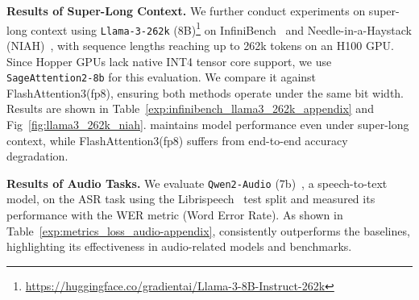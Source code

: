 \noindent\textbf{Results of Super-Long Context.} We further conduct experiments on super-long context using \texttt{Llama-3-262k} (8B)\footnote{\url{https://huggingface.co/gradientai/Llama-3-8B-Instruct-262k}} on InfiniBench~\cite{zhang-etal-2024-bench} and Needle-in-a-Haystack (NIAH)~\cite{LLMTest_NeedleInAHaystack}, with sequence lengths reaching up to 262k tokens on an H100 GPU. Since Hopper GPUs lack native INT4 tensor core support, we use \texttt{SageAttention2-8b} for this evaluation. We compare it against FlashAttention3(fp8), ensuring both methods operate under the same bit width.
Results are shown in Table~\ref{exp:infinibench_llama3_262k_appendix} and Fig~\ref{fig:llama3_262k_niah}. \our maintains model performance even under super-long context, while FlashAttention3(fp8) suffers from end-to-end accuracy degradation.

\noindent\textbf{Results of Audio Tasks.} We evaluate \texttt{Qwen2-Audio} (7b)~\cite{chu2024qwen2audiotechnicalreport},  a speech-to-text model, on the ASR task using the Librispeech~\cite{Librispeech} test split and measured its performance with the WER metric (Word Error Rate). As shown in Table~\ref{exp:metrics_loss_audio-appendix}, \our consistently outperforms the baselines, highlighting its effectiveness in audio-related models and benchmarks.

\begin{table}[h!]
    \caption{End-to-end metrics on \texttt{Qwen2-Audio} (7B).}
    \label{exp:metrics_loss_audio-appendix}
    \setlength\tabcolsep{5.5pt}
    \begin{center}
    \end{center}
    \vspace{-1em}
\end{table}
